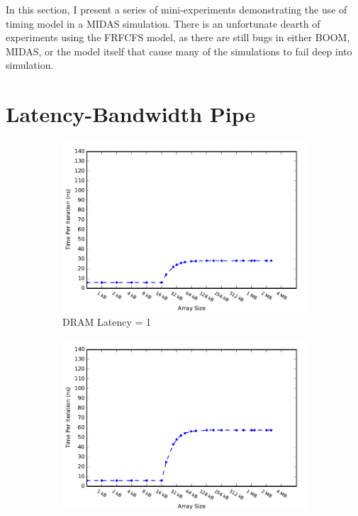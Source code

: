 In this section, I present a series of mini-experiments demonstrating the use
of timing model in a MIDAS simulation. There is an unfortunate dearth of
experiments using the FRFCFS model, as there are still bugs in either BOOM,
MIDAS, or the model itself that cause many of the simulations to fail deep into
simulation.

\section{Latency-Bandwidth Pipe}

\begin{figure}
\begin{subfigure}[t]{0.33\textwidth}
	\includegraphics[width=\textwidth]{figures/ccbench_lat1.pdf}
	\caption{DRAM Latency = 1}
\end{subfigure}
\begin{subfigure}[t]{0.33\textwidth}
	\includegraphics[width=\textwidth]{figures/ccbench_lat30.pdf}

\end{subfigure}
\end{figure}
